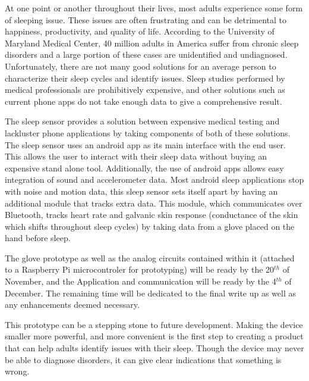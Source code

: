 \documentclass[finalProposal.tex]{subfiles}
\begin{document}
\onehalfspacing


\bigskip

At one point or another throughout their lives, most adults experience some form of sleeping issue. These issues are often frustrating and can be detrimental to happiness, productivity, and quality of life. According to the University of Maryland Medical Center, 40 million adults in America suffer from chronic sleep disorders and a large portion of these cases are unidentified and undiagnosed. 
Unfortunately, there are not many good solutions for an average person to characterize their sleep cycles and identify issues. Sleep studies performed by medical professionals are prohibitively expensive, and other solutions such as current phone apps do not take enough data to give a comprehensive result.

The sleep sensor provides a solution between expensive medical testing and lackluster phone applications by taking components of both of these solutions. The sleep sensor uses an android app as its main interface with the end user. This allows the user to interact with their sleep data without buying an expensive stand alone tool. Additionally, the use of android apps allows easy integration of sound and accelerometer data. Most android sleep applications stop with noise and motion data, this sleep sensor sets itself apart by having an additional module that tracks extra data. This module, which communicates over Bluetooth, tracks heart rate and galvanic skin response (conductance of the skin which shifts throughout sleep cycles) by taking data from a glove placed on the hand before sleep. 

The glove prototype as well as the analog circuits contained within it (attached to a Raspberry Pi microcontroler for prototyping) will be ready by the 20$^{th}$ of November, and the Application and communication will be ready by the 4$^{th}$ of December. The remaining time will be dedicated to the final write up as well as any enhancements deemed necessary. 

This prototype can be a stepping stone to future development. Making the device smaller more powerful, and more convenient is the first step to creating a product that can help adults identify issues with their sleep. Though the device may never be able to diagnose disorders, it can give clear indications that something is wrong. 
 
\end{document}
